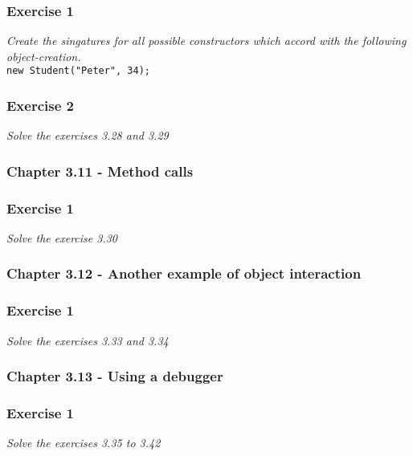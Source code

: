 \subsubsection*{Exercise 1}
\textit{Create the singatures for all possible constructors which accord
with the following object-creation.}\\
\lstinline{new Student("Peter", 34);}


\subsubsection*{Exercise 2}
\textit{Solve the exercises 3.28 and 3.29}\\

\subsubsection{Chapter 3.11 - Method calls}

\subsubsection*{Exercise 1}
\textit{Solve the exercise 3.30}\\

\subsubsection{Chapter 3.12 - Another example of object interaction}

\subsubsection*{Exercise 1}
\textit{Solve the exercises 3.33 and 3.34}\\

\subsubsection{Chapter 3.13 - Using a debugger}

\subsubsection*{Exercise 1}
\textit{Solve the exercises 3.35 to 3.42}\\
